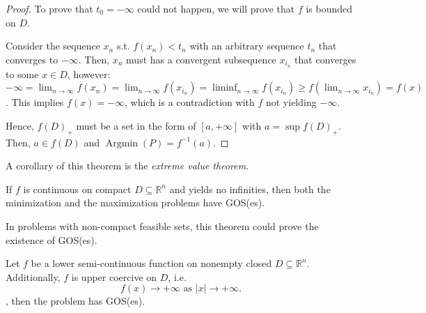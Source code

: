 \begin{proof}
To prove that \( t_{0} = -\infty \) could not happen, we will prove that \( f \)
is bounded on \( D \).

Consider the sequence \( x_{n} \) s.t. \( f(x_{n}) < t_{n} \) with an arbitrary
sequence \( t_{n} \) that converges to \( -\infty \). Then, \( x_{n} \) must
has a convergent subsequence \( x_{i_{n}} \) that converges to some \( x \in D \),
however: \( -\infty = \lim_{n \to
\infty} f(x_{n}) = \lim_{n \to \infty} f(x_{i_{n}}) = \liminf_{n \to \infty}
f(x_{i_{n}}) \ge f(\lim_{n \to \infty} x_{i_{n}}) = f(x) \). This implies \(
f(x) = -\infty \), which is a contradiction with \( f \) not yielding \( -\infty
\).

Hence, \( f(D)_{+} \) must be a set in the form of \( [a, +\infty] \) with \( a
= \sup f(D)_{+}\). Then, \( a \in f(D) \) and \( \operatorname{Argmin}(P)
= f^{-1}(a)\).
\end{proof}
A corollary of this theorem is the \textit{extreme value theorem}.

\begin{corollary}
  If \( f \) is continuous on compact \( D \subseteq \mathbb{R}^{n} \) and
  yields no infinities, then both the minimization and the maximization problems
  have GOS(es).
\end{corollary}

In problems with non-compact feasible sets, this theorem could prove the
existence of GOS(es).

\begin{theorem}
\label{thr:coercive condition}
  Let \( f \) be a lower semi-continuous function on nonempty closed \( D \subseteq
  \mathbb{R}^{n} \).
  Additionally, \( f \) is upper coercive on \( D \), i.e.
  \[
    f(x) \to +\infty \text{ as } |x| \to  +\infty
  .\], then the problem has GOS(es).
\end{theorem}

